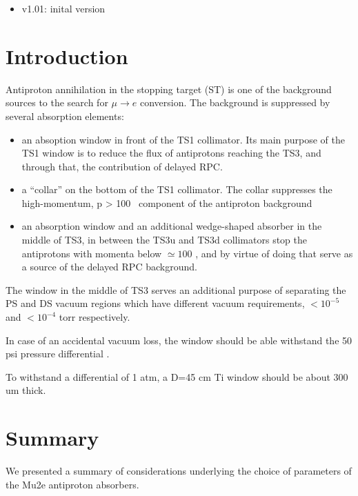 \documentclass[12pt]{article}
\begin{document}
\begin{itemize}
\item
  v1.01: inital version
\end{itemize}

\newpage
\section {Introduction}

Antiproton annihilation in the stopping target (ST) is one of the background
sources to the search for $\mu \to e$ conversion. The background is suppressed
by several absorption elements:

\begin{itemize}
\item
  an absoption window in front of the TS1 collimator.
  Its main purpose of the TS1 window is to reduce the flux of antiprotons
  reaching the TS3, and through that, the contribution of delayed RPC.
\item
  a ``collar'' on the bottom of the TS1 collimator. The collar suppresses
  the high-momentum, p > 100 \MeVc\  component of the antiproton background
\item
  an absorption window and an additional wedge-shaped absorber in the
  middle of TS3, in between the TS3u and TS3d collimators stop the
  antiprotons with momenta below $\simeq 100$ \MeVc, and by virtue of doing
  that serve as a source of the delayed RPC background.
\end{itemize}

The window in the middle of TS3 serves an additional purpose of separating
the PS and DS vacuum regions which have different vacuum requirements,
$< 10^{-5}$ and $< 10^{-4}$ torr respectively.

In case of an accidental vacuum loss, the window should be able withstand
the 50 psi pressure differential \cite{XXXX}.

To withstand a differential of 1 atm, a D=45 cm Ti window should
be about 300 um thick.





\section {Summary}

We presented a summary of considerations underlying the choice of parameters 
of the Mu2e antiproton absorbers. 

%
\newpage



% 
% 
\end{document}
